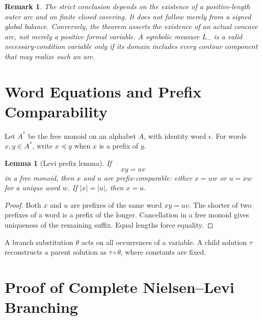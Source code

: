 \documentclass[11pt]{article}
\newtheorem{lemma}[theorem]{Lemma}
\newtheorem{remark}[theorem]{Remark}
\begin{document}
\begin{remark}
The strict conclusion depends on the existence of a positive-length outer arc and on finite closed covering. It does not follow merely from a signed global balance. Conversely, the theorem asserts the existence of an actual concave arc, not merely a positive formal variable. A symbolic measure $L_-$ is a valid necessary-condition variable only if its domain includes every contour component that may realize such an arc.
\end{remark}

\section{Word Equations and Prefix Comparability}

Let $A^*$ be the free monoid on an alphabet $A$, with identity word $\epsilon$. For words $x,y\in A^*$, write $x\preceq y$ when $x$ is a prefix of $y$.

\begin{lemma}[Levi prefix lemma]\label{lem:levi}
If
\[
  xy=uv
\]
in a free monoid, then $x$ and $u$ are prefix-comparable: either $x=uw$ or $u=xw$ for a unique word $w$. If $|x|=|u|$, then $x=u$.
\end{lemma}

\begin{proof}
Both $x$ and $u$ are prefixes of the same word $xy=uv$. The shorter of two prefixes of a word is a prefix of the longer. Cancellation in a free monoid gives uniqueness of the remaining suffix. Equal lengths force equality.
\end{proof}

A branch substitution $\theta$ acts on all occurrences of a variable. A child solution $\tau$ reconstructs a parent solution as $\tau\circ\theta$, where constants are fixed.

\section{Proof of Complete Nielsen--Levi Branching}
\end{document}
